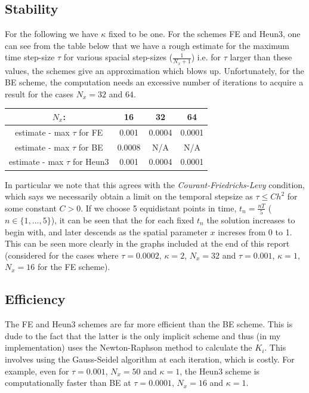 \documentclass[10pt]{article}
\begin{document}
\subsection{Stability}
For the following we have $\kappa$ fixed to be one. For the schemes FE and Heun3, one can see from the table below that we have a rough estimate for the maximum time step-size $\tau$ for various spacial step-sizes ($\frac{1}{N_x+1}$) i.e. for $\tau$ larger than these values, the schemes give an approximation which blows up. Unfortunately, for the BE scheme, the computation needs an excessive number of iterations to acquire a result for the cases $N_x =32$ and $64$.
\begin{center}


    \begin{tabular}{|c||c|c|c|}
    \hline
        $N_x$:      & 16 & 32 & 64 \\
    \hline
       \hline
       estimate - max $\tau$ for FE  & 0.001 & 0.0004 & 0.0001    \\
       \hline
       estimate - max $\tau$ for BE  & 0.0008  & N/A& N/A  \\
        \hline
       estimate - max $\tau$ for Heun3 & 0.001 & 0.0004 & 0.0001 \\
       \hline
    \end{tabular}
\end{center}
In particular we note that this agrees with the \emph{Courant-Friedrichs-Levy} condition, which says we necessarily obtain a limit on the temporal stepsize as $\tau \leq Ch^2$ for some constant $C>0$. If we choose 5 equidistant points in time, $t_n = \frac{nT}{5}$ ($n \in \{1, \dots, 5\}$), it can be seen that the for each fixed $t_n$ the solution increases to begin with, and later descends as the spatial parameter $x$ increses from 0 to 1. This can be seen more clearly in the graphs included at the end of this report (considered for the cases where $\tau = 0.0002$, $\kappa = 2$, $N_x = 32$ and  $\tau = 0.001$, $\kappa = 1$, $N_x = 16$ for the FE scheme).

\subsection{Efficiency}
The FE and Heun3 schemes are far more efficient than the BE scheme. This is dude to the fact that the latter is the only implicit scheme and thus (in my implementation) uses the Newton-Raphson method to calculate the $K_i$. This involves using the Gauss-Seidel algorithm at each iteration, which is costly. For example, even for $\tau = 0.001$, $N_x = 50$ and $\kappa = 1$, the Heun3 scheme is computationally faster than BE at  $\tau = 0.0001$, $N_x = 16$ and $\kappa = 1$.
\end{document}
